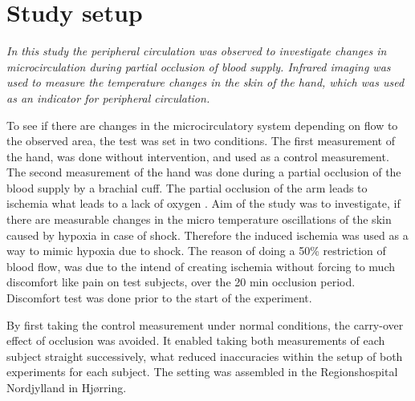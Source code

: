 \chapter{Study setup}

\textit{In this study the peripheral circulation was observed to investigate changes in microcirculation during partial occlusion of blood supply. Infrared imaging was used to measure the temperature changes in the skin of the hand, which was used as an indicator for peripheral circulation.} 


To see if there are changes in the microcirculatory system depending on flow to the observed area, the test was set in two conditions. The first measurement of the hand, was done without intervention, and used as a control measurement. The second measurement of the hand was done during a partial occlusion of the blood supply by a brachial cuff. The partial occlusion of the arm leads to ischemia what leads to a lack of oxygen \cite{martini2012}. Aim of the study was to investigate, if there are measurable changes in the micro temperature oscillations of the skin caused by hypoxia in case of shock. Therefore the induced ischemia was used as a way to mimic hypoxia due to shock.
The reason of doing a 50\% restriction of blood flow, was due to the intend of creating ischemia without forcing to much discomfort like pain on test subjects, over the 20 min occlusion period. Discomfort test was done prior to the start of the experiment.

By first taking the control measurement under normal conditions, the carry-over effect of occlusion was avoided. It enabled taking both measurements of each subject straight successively, what reduced inaccuracies within the setup of both experiments for each subject. The setting was assembled in the Regionshospital Nordjylland in Hj\o{}rring.